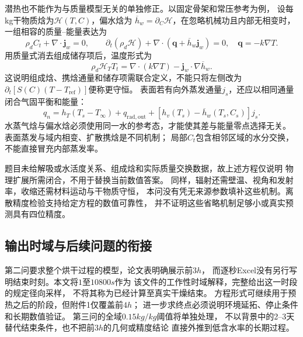 潜热也不能作为与质量模型无关的单独修正。以固定骨架和常压参考为例，
设每kg干物质焓为$\mathcal H(T,C)$，偏水焓为
$\overline h_w=\partial_C\mathcal H$，在忽略机械功且内部无相变时，
一组相容的质量--能量表达为
\begin{equation}
 \rho_d C_t+\nabla\cdot\boldsymbol j_w=0,\qquad
 \partial_t(\rho_d\mathcal H)
 +\nabla\cdot(\boldsymbol q+\overline h_w\boldsymbol j_w)=0,
 \quad\boldsymbol q=-k\nabla T.
\label{q2-eq-enthalpy}
\end{equation}
用质量式消去组成储存项后，温度形式为
\begin{equation}
 \rho_d\mathcal H_T T_t=
 \nabla\cdot(k\nabla T)-\boldsymbol j_w\cdot\nabla\overline h_w.
\label{q2-eq-enthalpy-reduced}
\end{equation}
这说明组成焓、携焓通量和储存项需联合定义，不能只将左侧改为
$\partial_t[S(C)(T-T_{\mathrm{ref}})]$便称更守恒。
表面若有向外蒸发通量$j_s$，还应以相同通量闭合气固平衡和能量：
\begin{equation}
 q_n=h_T(T_s-T_\infty)+q_{\mathrm{rad,out}}
       +[h_v(T_s)-\overline h_w(T_s,C_s)]j_s.
\label{q2-eq-surface-enthalpy}
\end{equation}
水蒸气焓与偏水焓必须使用同一水的参考态，才能使其差与能量零点选择无关。
表面蒸发与域内相变、扩散携焓是不同机制\cite{comsol}；
局部$C_t$包含相邻区域的水分交换，不能直接冒充内部蒸发率。

题目未给解吸或水活度关系、组成焓和实际质量交换数据，故上述方程仅说明
物理扩展所需闭合，不用于替换当前数值答案。
同样，辐射还需壁温、视角和发射率，收缩还需材料运动与干物质守恒，
本问没有凭无来源参数填补这些机制。离散精度检验支持给定方程的数值可靠性，
并不证明这些省略机制足够小或真实预测具有四位精度。

\subsection{输出时域与后续问题的衔接}
第二问要求整个烘干过程的模型，论文表明确展示前$3\unit{h}$，
而逐秒Excel没有另行写明结束时刻。本文将$1$至$10800\unit{s}$作为
该文件的工作性时域解释，完整给出这一时段的规定径向采样，
不将其称为已经计算至真实干燥结束。
方程形式可继续用于预热之后的阶段，但附件1仅覆盖前$4\unit{h}$；
进一步求终点必须说明环境延拓、停止条件和长期数值验证。
第三问的全域$0.15\unit{kg/kg}$阈值将单独处理，
不以背景中的2--3天替代结束条件，也不把前$3\unit{h}$的几何或精度结论
直接外推到低含水率的长期过程。
\FloatBarrier

